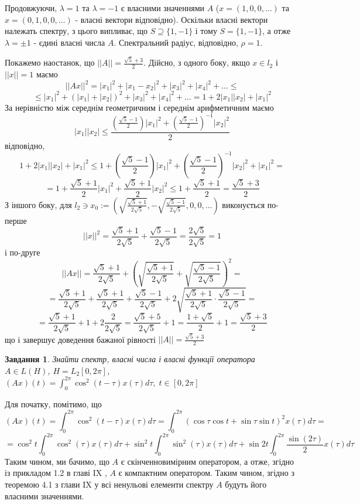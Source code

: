 \documentclass[12pt]{article} %
\newcommand{\mynorm}[1]{\left|\left|#1\right|\right|}
\newcommand{\myabs}[1]{\left|#1\right|}
\newtheorem{prob}{Завдання}
\begin{document}
	Продовжуючи, $\lambda=1$ та $\lambda=-1$ є власними значеннями $A$ ($x=(1,0,0,\dots)$ та $x=(0,1,0,0,\dots)$ - власні вектори відповідно).
	Оскільки власні вектори належать спектру, з цього випливає, що $S\supseteq\{1,-1\}$ і тому $S=\{1,-1\}$, а отже $\lambda=\pm 1$ - єдині
	власні числа $A$. Спектральний радіус, відповідно, $\rho=1$.

	Покажемо наостанок, що $\mynorm{A}=\frac{\sqrt{5}+3}{2}$. Дійсно, з одного боку, якщо $x\in l_2$ і $\mynorm{x}=1$ маємо
	\[\mynorm{Ax}^2=\myabs{x_1}^2+\myabs{x_1-x_2}^2+\myabs{x_3}^2+\myabs{x_4}^2+\dots\leq\]
	\[\leq \myabs{x_1}^2+(\myabs{x_1}+\myabs{x_2})^2+\myabs{x_3}^2+\myabs{x_4}^2+\dots=1+2\myabs{x_1}\myabs{x_2}+\myabs{x_1}^2\]
	За нерівністю між середнім геометричним і середнім арифметичним маємо
	\[\myabs{x_1}\myabs{x_2}\leq\frac{\left({\frac{\sqrt{5}-1}{2}}\right)\myabs{x_1}^2+\left(\frac{\sqrt{5}-1}{2}\right)^{-1}\myabs{x_2}^2}{2}\]
	відповідно,
	\[1+2\myabs{x_1}\myabs{x_2}+\myabs{x_1}^2
	\leq1+\left({\frac{\sqrt{5}-1}{2}}\right)\myabs{x_1}^2+\left(\frac{\sqrt{5}-1}{2}\right)^{-1}\myabs{x_2}^2+\myabs{x_1}^2=\]
	\[=1+\frac{\sqrt{5}+1}{2}\myabs{x_1}^2+\frac{\sqrt{5}+1}{2}\myabs{x_2}^2\leq 1+\frac{\sqrt{5}+1}{2}=\frac{\sqrt{5}+3}{2}\]
	З іншого боку, для $l_2\ni x_0:=(\sqrt{\frac{\sqrt{5}+1}{2\sqrt{5}}},-\sqrt{\frac{\sqrt{5}-1}{2\sqrt{5}}},0,0,\dots)$ виконується
	по-перше
	\[\mynorm{x}^2=\frac{\sqrt{5}+1}{2\sqrt{5}}+\frac{\sqrt{5}-1}{2\sqrt{5}}=\frac{2\sqrt{5}}{2\sqrt{5}}=1\]
	і по-друге
	\[\mynorm{Ax}=\frac{\sqrt{5}+1}{2\sqrt{5}}+\left(\sqrt{\frac{\sqrt{5}+1}{2\sqrt{5}}}+\sqrt{\frac{\sqrt{5}-1}{2\sqrt{5}}}\right)^2=\]\[=
	\frac{\sqrt{5}+1}{2\sqrt{5}}+\frac{\sqrt{5}+1}{2\sqrt{5}}+{\frac{\sqrt{5}-1}{2\sqrt{5}}}+2\sqrt{
	\frac{\sqrt{5}+1}{2\sqrt{5}}\cdot\frac{\sqrt{5}-1}{2\sqrt{5}}}=\]
	\[=\frac{\sqrt{5}+1}{2\sqrt{5}}+1+2\frac{2}{2\sqrt{5}}=\frac{\sqrt{5}+5}{2\sqrt{5}}+1=\frac{1+\sqrt{5}}{2}+1=\frac{\sqrt{5}+3}{2}\]
	що і завершує доведення бажаної рівності $\mynorm{A}=\frac{\sqrt{5}+3}{2}$
\begin{prob}Знайти спектр, власні числа і власні функції оператора $A\in L(H)$, $H=L_2[0,2\pi]$, $(Ax)(t)=\int_0^{2\pi}\cos^2(t-\tau)x(\tau)
	d\tau,\;t\in[0,2\pi]$
\end{prob}
Для початку, помітимо, що
\newcommand{\myint}[1]{\int_0^{2\pi}#1x(\tau)d\tau}
\[(Ax)(t)=\int_0^{2\pi}\cos^2(t-\tau)x(\tau)d\tau=\int_0^{2\pi}(\cos\tau\cos t+\sin\tau\sin t)^2x(\tau)d\tau=\]
\[=\cos^2 t\myint{\cos^2(\tau)}+\sin^2 t\myint{\sin^2(\tau)}+\sin 2t\myint{\frac{\sin (2\tau)}{2}}\]
Таким чином, ми бачимо, що $A$ є скінченновимірним оператором, а отже, згідно із прикладом 1.2 в главі IX \cite{tb}, 
$A$ є компактним оператором. Таким чином, згідно з теоремою 4.1 з глави IX у \cite{tb} всі ненульові елементи спектру $A$ будуть його власними
значеннями.
\end{document}
